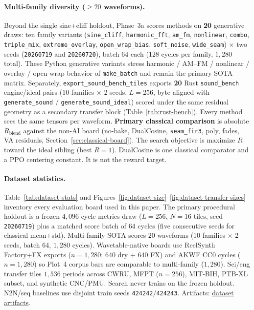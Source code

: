 \paragraph{Multi-family diversity ($\ge 20$ waveforms).}
Beyond the single sine{+}cliff holdout, Phase~3a scores methods on \textbf{20} generative draws: ten family variants (\texttt{sine\_cliff}, \texttt{harmonic\_fft}, \texttt{am\_fm}, \texttt{nonlinear}, \texttt{combo}, \texttt{triple\_mix}, \texttt{extreme\_overlay}, \texttt{open\_wrap\_bias}, \texttt{soft\_noise}, \texttt{wide\_seam}) $\times$ two seeds (\texttt{20260719} and \texttt{20260720}), batch 64 each ($128$ cycles per family, $1{,}280$ total).
These Python generative variants stress harmonic / AM--FM / nonlinear / overlay / open-wrap behavior of \texttt{make\_batch} and remain the primary SOTA matrix.
Separately, \texttt{export\_sound\_bench\_tiles} exports \textbf{20} Rust \texttt{sound\_bench} engine/ideal pairs (10 families $\times$ 2 seeds, $L{=}256$, byte-aligned with \texttt{generate\_sound} / \texttt{generate\_sound\_ideal}) scored under the same residual geometry as a secondary transfer block (Table~\ref{tab:rust-bench}).
Every method sees the same tensors per waveform.
\textbf{Primary classical comparison} is absolute $R_{\mathrm{blend}}$ against the non-AI board (no-bake, DualCosine, \texttt{seam\_fir3}, poly, fades, VA residuals, Section~\ref{sec:classical-board}).
The search objective is maximize $R$ toward the ideal sibling (best $R{=}1$).
DualCosine is one classical comparator and a PPO centering constant.
It is not the reward target.

\paragraph{Dataset statistics.}
Table~\ref{tab:dataset-stats} and Figures~\ref{fig:dataset-size}--\ref{fig:dataset-transfer-sizes} inventory every evaluation board used in this paper.
The primary procedural holdout is a frozen $4{,}096$-cycle metrics draw ($L{=}256$, $N{=}16$ tiles, seed \texttt{20260719}) plus a matched score batch of $64$ cycles (five consecutive seeds for classical mean$\pm$std).
Multi-family SOTA scores $20$ waveforms ($10$ families $\times$ $2$ seeds, batch $64$, $1{,}280$ cycles).
Wavetable-native boards use ReelSynth Factory+FX exports ($n{=}1{,}280$: $640$ dry + $640$ FX) and AKWF CC0 cycles ($n{=}1{,}280$) so Plot~4 corpus bars are comparable to multi-family ($1{,}280$).
Sci/eng transfer tiles $1{,}536$ periods across CWRU, MFPT ($n{=}256$), MIT-BIH, PTB-XL subset, and synthetic CNC/PMU.
Search never trains on the frozen holdout. N2N/seq baselines use disjoint train seeds \texttt{424242}/\texttt{424243}.
Artifacts: \href{https://github.com/reeldemo/denoise-opt-meta/tree/master/paper/Unsupervised_Wrap-Discontinuity_Repair_in_Wavetable_Synthesis_via_Hybrid_GA-PPO_Meta-Search_v12/figures}{dataset artifacts}.


